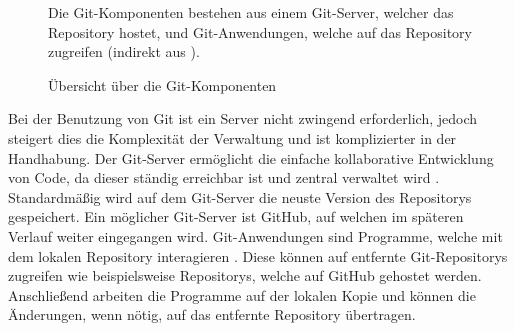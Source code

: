 \begin{figure}
    {
        \centering
        \caption{Übersicht über die Git-Komponenten}
        \label{fig:git}
        \small
        Die Git-Komponenten bestehen aus einem Git-Server, welcher das Repository hostet, und Git-Anwendungen, welche auf das Repository zugreifen (indirekt aus \cite{ponuthorai_version_2022}).
    }
\end{figure}

Bei der Benutzung von Git ist ein Server nicht zwingend erforderlich, jedoch steigert dies die Komplexität der Verwaltung und ist komplizierter in der Handhabung.
Der Git-Server ermöglicht die einfache kollaborative Entwicklung von Code, da dieser ständig erreichbar ist und zentral verwaltet wird \autocite{ponuthorai_version_2022}.
Standardmäßig wird auf dem Git-Server die neuste Version des Repositorys gespeichert.
Ein möglicher Git-Server ist GitHub, auf welchen im späteren Verlauf weiter eingegangen wird.
Git-Anwendungen sind Programme, welche mit dem lokalen Repository interagieren \autocite{ponuthorai_version_2022}.
Diese können auf entfernte Git-Repositorys zugreifen wie beispielsweise Repositorys, welche auf GitHub gehostet werden.
Anschließend arbeiten die Programme auf der lokalen Kopie und können die Änderungen, wenn nötig, auf das entfernte Repository übertragen.


